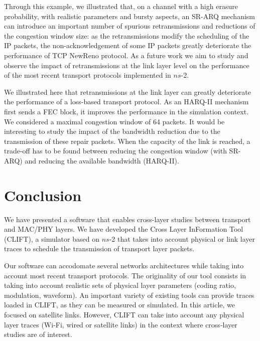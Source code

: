 \documentclass[conference,letterpaper]{IEEEtran}
\begin{document}
Through this example, we illustrated that, on a channel with a high erasure probability, with realistic parameters and bursty aspects, an SR-ARQ mechanism can introduce an important number of spurious retransmissions and reductions of the congestion window size: as the retransmissions modify the scheduling of the IP packets, the non-acknowledgement of some IP packets greatly deteriorate the performance of TCP NewReno protocol. As a future work we aim to study and observe the impact of retransmissions at the link layer level on the performance of the most recent transport protocols implemented in $ns$-2.

We illustrated here that retransmissions at the link layer can greatly deteriorate the performance of a loss-based transport protocol. As an HARQ-II mechanism first sends a FEC block, it improves the performance in the simulation context. We considered a maximal congestion window of 64 packets. It would be interesting to study the impact of the bandwidth reduction due to the transmission of these repair packets. When the capacity of the link is reached, a trade-off has to be found between reducing the congestion window (with SR-ARQ) and reducing the available bandwidth (HARQ-II).







\section{Conclusion}
\label{sec::conclusion}



We have presented a software that enables cross-layer studies between transport and MAC/PHY layers. We have developed the Cross Layer InFormation Tool (CLIFT), a simulator based on $ns$-2 that takes into account physical or link layer traces to schedule the transmission of transport layer packets. 

Our software can accodomate several networks architectures while taking into account most recent transport protocols. The originality of our tool consists in taking into account realistic sets of physical layer parameters (coding ratio, modulation, waveform). An important variety of existing tools can provide traces loaded in CLIFT, as they can be measured or simulated. 
In this article, we focused on satellite links. However, CLIFT can take into account any physical layer traces (Wi-Fi, wired or satellite links) in the context where cross-layer studies are of interest. 
\end{document}
